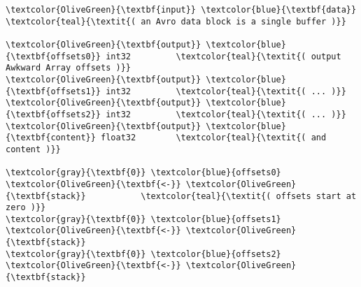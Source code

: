 \documentclass{webofc}
\begin{document}
\begin{Verbatim}[commandchars=\\\{\}]
\textcolor{OliveGreen}{\textbf{input}} \textcolor{blue}{\textbf{data}}                    \textcolor{teal}{\textit{( an Avro data block is a single buffer )}}

\textcolor{OliveGreen}{\textbf{output}} \textcolor{blue}{\textbf{offsets0}} int32         \textcolor{teal}{\textit{( output Awkward Array offsets )}}
\textcolor{OliveGreen}{\textbf{output}} \textcolor{blue}{\textbf{offsets1}} int32         \textcolor{teal}{\textit{( ... )}}
\textcolor{OliveGreen}{\textbf{output}} \textcolor{blue}{\textbf{offsets2}} int32         \textcolor{teal}{\textit{( ... )}}
\textcolor{OliveGreen}{\textbf{output}} \textcolor{blue}{\textbf{content}} float32        \textcolor{teal}{\textit{( and content )}}

\textcolor{gray}{\textbf{0}} \textcolor{blue}{offsets0} \textcolor{OliveGreen}{\textbf{<-}} \textcolor{OliveGreen}{\textbf{stack}}           \textcolor{teal}{\textit{( offsets start at zero )}}
\textcolor{gray}{\textbf{0}} \textcolor{blue}{offsets1} \textcolor{OliveGreen}{\textbf{<-}} \textcolor{OliveGreen}{\textbf{stack}}
\textcolor{gray}{\textbf{0}} \textcolor{blue}{offsets2} \textcolor{OliveGreen}{\textbf{<-}} \textcolor{OliveGreen}{\textbf{stack}}


\end{Verbatim}
\end{document}
